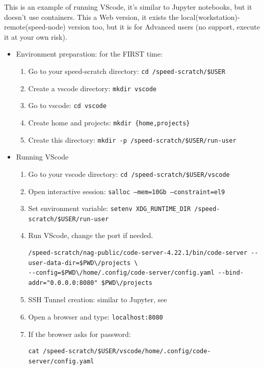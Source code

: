 This is an example of running VScode, it's similar to Jupyter notebooks, but it doesn't use containers.
This a Web version, it exists the local(workstation)-remote(speed-node) version too, but it is for Advanced users (no support, execute it at your own risk).

\begin{itemize}
\item
Environment preparation: for the FIRST time:
\begin{enumerate}
\item
Go to your speed-scratch directory: \texttt{cd /speed-scratch/\$USER}
\item
Create a vscode directory: \texttt{mkdir vscode}
\item
Go to vscode: \texttt{cd vscode}
\item
Create home and projects: \texttt {mkdir \{home,projects\}}
\item
Create this directory: \texttt {mkdir -p /speed-scratch/\$USER/run-user}
\end{enumerate}
\item
Running VScode
\begin{enumerate}
\item 
Go to your vscode directory: \texttt{cd /speed-scratch/\$USER/vscode}
\item
Open interactive session: \texttt {salloc --mem=10Gb --constraint=el9}
\item
Set environment variable: \texttt {setenv XDG\_RUNTIME\_DIR /speed-scratch/\$USER/run-user}
\item 
Run VScode, change the port if needed.
\scriptsize
\begin{verbatim}
/speed-scratch/nag-public/code-server-4.22.1/bin/code-server --user-data-dir=$PWD\/projects \
--config=$PWD\/home/.config/code-server/config.yaml --bind-addr="0.0.0.0:8080" $PWD\/projects
\end{verbatim}
\normalsize
\item
SSH Tunnel creation: similar to Jupyter, see 
\item
Open a browser and type: \texttt {localhost:8080}
\item
If the browser asks for password: 
\begin{verbatim}
cat /speed-scratch/$USER/vscode/home/.config/code-server/config.yaml
\end{verbatim}

\end{enumerate}
\end{itemize}

